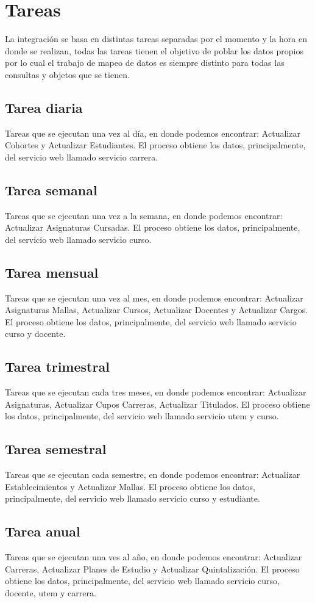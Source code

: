 \documentclass[a4paper,12pt,openany,oneside]{book}
\begin{document}
\section{Tareas}
La integración se basa en distintas tareas separadas por el momento y la hora en donde se realizan, todas las tareas tienen el objetivo de poblar los datos propios por lo cual el trabajo de mapeo de datos es siempre distinto para todas las consultas y objetos que se tienen.
\subsection{Tarea diaria}
Tareas que se ejecutan una vez al día, en donde podemos encontrar: Actualizar Cohortes y Actualizar Estudiantes. El proceso obtiene los datos, principalmente, del servicio web llamado servicio carrera.
\subsection{Tarea semanal}
Tareas que se ejecutan una vez a la semana, en donde podemos encontrar: Actualizar Asignaturas Cursadas. El proceso obtiene los datos, principalmente, del servicio web llamado servicio curso.
\subsection{Tarea mensual}
Tareas que se ejecutan una vez al mes, en donde podemos encontrar: Actualizar Asignaturas Mallas, Actualizar Cursos, Actualizar Docentes y Actualizar Cargos. El proceso obtiene los datos, principalmente, del servicio web llamado servicio curso y docente.
\subsection{Tarea trimestral}
Tareas que se ejecutan cada tres meses, en donde podemos encontrar: Actualizar Asignaturas, Actualizar Cupos Carreras, Actualizar Titulados. El proceso obtiene los datos, principalmente, del servicio web llamado servicio utem y curso.
\subsection{Tarea semestral}
Tareas que se ejecutan cada semestre, en donde podemos encontrar: Actualizar Establecimientos y Actualizar Mallas. El proceso obtiene los datos, principalmente, del servicio web llamado servicio curso y estudiante.
\subsection{Tarea anual}
Tareas que se ejecutan una ves al año, en donde podemos encontrar: Actualizar Carreras, Actualizar Planes de Estudio y Actualizar Quintalización. El proceso obtiene los datos, principalmente, del servicio web llamado servicio curso, docente, utem y carrera.
\end{document}
